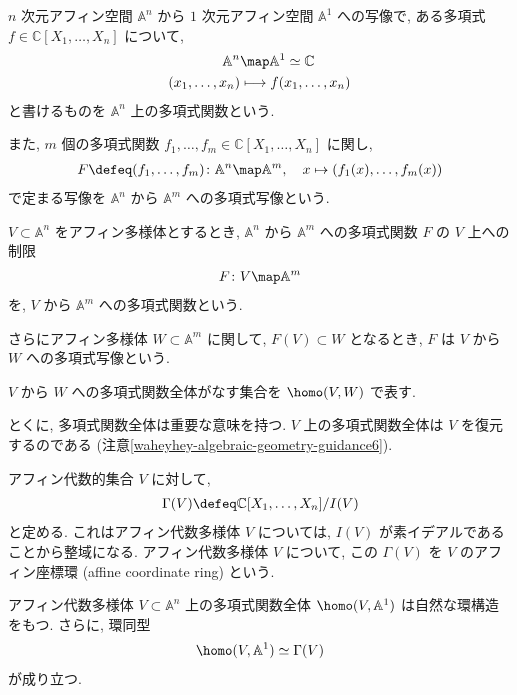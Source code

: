 \documentclass[openany, a4paper, oneside]{jsbook}
\begin{document}
\begin{defn}[多項式写像]
$n$ 次元アフィン空間 $\mathbb{A}^n$ から $1$ 次元アフィン空間 $\mathbb{A}^1$ への写像で,
ある多項式 $f \in \mathbb{C}[X_1,\dots,X_n]$ について,
\begin{align}
 \mathbb{A}^n
 &\map
 \mathbb{A}^1
 \simeq
 \mathbb{C} \\
 (x_1,\dots,x_n)
 &\longmapsto
 f (x_1,\dots,x_n)
\end{align}
と書けるものを $\mathbb{A}^n$ 上の多項式関数という.

また, $m$ 個の多項式関数 $f_1,\dots,f_m \in \mathbb{C}[X_1,\dots,X_n]$ に関し,
\begin{align}
 F
 \defeq
 (f_1,\dots,f_m) \colon \mathbb{A}^n \map \mathbb{A}^m, \quad x \mapsto (f_1 (x),\dots,f_m (x))
\end{align}
で定まる写像を $\mathbb{A}^n$ から $\mathbb{A}^m$ への多項式写像という.

$V \subset \mathbb{A}^n$ をアフィン多様体とするとき,
$\mathbb{A}^n$ から $\mathbb{A}^m$ への多項式関数 $F$ の $V$ 上への制限
\begin{align}
 F \colon V \map \mathbb{A}^m
\end{align}
を, $V$ から $\mathbb{A}^m$ への多項式関数という.

さらにアフィン多様体 $W \subset \mathbb{A}^m$ に関して, $F (V) \subset W$ となるとき, $F$ は $V$ から $W$ への多項式写像という.

$V$ から $W$ への多項式関数全体がなす集合を $\homo (V,W)$ で表す. \fin
\end{defn}
とくに, 多項式関数全体は重要な意味を持つ.
$V$ 上の多項式関数全体は $V$ を復元するのである (注意\ref{waheyhey-algebraic-geometry-guidance6}).
\begin{defn}[アフィン座標環]
アフィン代数的集合 $V$ に対して,
\begin{align}
 \Gamma ( V )
 \defeq
 \mathbb{C}[X_1, \dots, X_n] /  I ( V )
\end{align}
と定める.
これはアフィン代数多様体 $V$ については, $I (V)$ が素イデアルであることから整域になる.
アフィン代数多様体 $V$ について, この $\Gamma (V)$ を $V$ のアフィン座標環 (affine coordinate ring) という. \fin
\end{defn}
\begin{lem}
アフィン代数多様体 $V \subset \mathbb{A}^n$ 上の多項式関数全体 $\homo (V,\mathbb{A}^1)$ は自然な環構造をもつ.
さらに, 環同型
\begin{align}
 \homo (V, \mathbb{A}^1)
 \simeq
 \Gamma (V)
\end{align}
が成り立つ. \fin
\end{lem}
\end{document}
